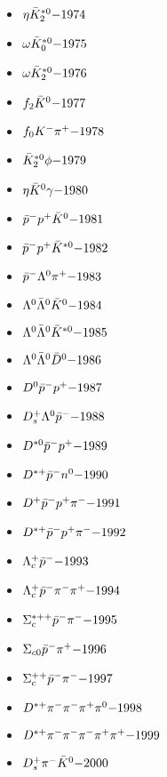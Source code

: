 \begin{multicols}{3}
\begin{itemize}
 \item $ \eta \bar{K}_{2}^{*0} \hfill{-1974}$
 \item $ \omega \bar{K}_{0}^{*0} \hfill{-1975}$
 \item $ \omega \bar{K}_{2}^{*0} \hfill{-1976}$
 \item $ f_{2} \bar{K}^{0} \hfill{-1977}$
 \item $ f_{0} K^{-} \pi^{+} \hfill{-1978}$
 \item $ \bar{K}_{2}^{*0} \phi \hfill{-1979}$
 \item $ \eta \bar{K}^{0} \gamma \hfill{-1980}$
 \item $ \bar{p}^{-} p^{+} \bar{K}^{0} \hfill{-1981}$
 \item $ \bar{p}^{-} p^{+} \bar{K}^{*0} \hfill{-1982}$
 \item $ \bar{p}^{-} \Lambda^{0} \pi^{+} \hfill{-1983}$
 \item $ \Lambda^{0} \bar{\Lambda}^{0} \bar{K}^{0} \hfill{-1984}$
 \item $ \Lambda^{0} \bar{\Lambda}^{0} \bar{K}^{*0} \hfill{-1985}$
 \item $ \Lambda^{0} \bar{\Lambda}^{0} \bar{D}^{0} \hfill{-1986}$
 \item $ D^{0} \bar{p}^{-} p^{+} \hfill{-1987}$
 \item $ D_{s}^{+} \Lambda^{0} \bar{p}^{-} \hfill{-1988}$
 \item $ D^{*0} \bar{p}^{-} p^{+} \hfill{-1989}$
 \item $ D^{*+} \bar{p}^{-} n^{0} \hfill{-1990}$
 \item $ D^{+} \bar{p}^{-} p^{+} \pi^{-} \hfill{-1991}$
 \item $ D^{*+} \bar{p}^{-} p^{+} \pi^{-} \hfill{-1992}$
 \item $ \Lambda_{c}^{+} \bar{p}^{-} \hfill{-1993}$
 \item $ \Lambda_{c}^{+} \bar{p}^{-} \pi^{-} \pi^{+} \hfill{-1994}$
 \item $ \Sigma_{c}^{*++} \bar{p}^{-} \pi^{-} \hfill{-1995}$
 \item $ \Sigma_{c0} \bar{p}^{-} \pi^{+} \hfill{-1996}$
 \item $ \Sigma_{c}^{++} \bar{p}^{-} \pi^{-} \hfill{-1997}$
 \item $ D^{*+} \pi^{-} \pi^{-} \pi^{+} \pi^{0} \hfill{-1998}$
 \item $ D^{*+} \pi^{-} \pi^{-} \pi^{-} \pi^{+} \pi^{+} \hfill{-1999}$
 \item $ D_{s}^{+} \pi^{-} \bar{K}^{0} \hfill{-2000}$
 \end{itemize} 
 \end{multicols} 
